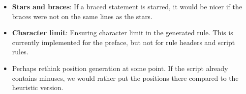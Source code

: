 \begin{itemize}
\begin{itemize}
\end{itemize}
\item \textbf{Stars and braces}: If a braced statement is starred, it would be nicer if the braces were not on the same lines as the stars.
\item \textbf{Character limit}: Ensuring character limit in the generated rule. This is currently implemented for the preface, but not for rule headers and script rules.
\item Perhaps rethink position generation at some point. If the script already contains minuses, we would rather put the positions there compared to the heuristic version.
\end{itemize}
